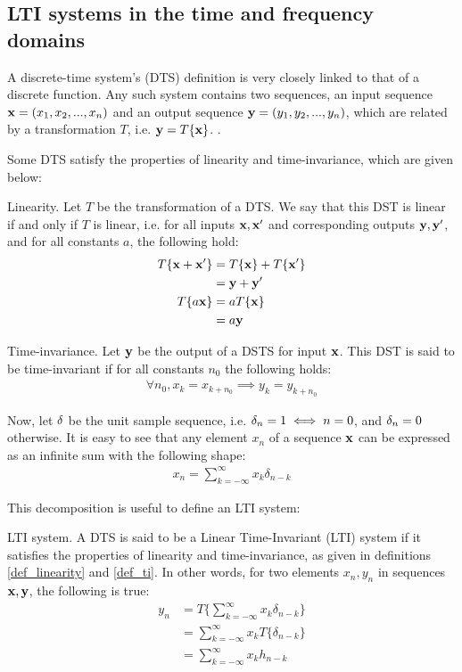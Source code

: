 \documentclass[../main.tex]{subfiles}
\begin{document}
\subsection{LTI systems in the time and frequency domains} \label{subsection_lti} 
A discrete-time system's (DTS) definition is very closely linked to that of a discrete function. Any such system contains two sequences, an input sequence $\mathbf{x} = (x_1, x_2, ..., x_n)$ and an output sequence $\mathbf{y} = (y_1, y_2, ..., y_n)$, which are related by a transformation $T$, i.e. $\mathbf{y} = T\{\mathbf{x}\}$.  \cite{Oppenheim2010}. 
\par Some DTS satisfy the properties of linearity and time-invariance, which are given below:
\begin{definition}{Linearity.} \label{def_linearity}
Let $T$ be the transformation of a DTS. We say that this DST is linear if and only if $T$ is linear, i.e. for all inputs $\mathbf{x, x}'$ and corresponding outputs $\mathbf{y, y}'$, and for all constants $a$, the following hold:
\begin{align*}
T\{\mathbf{x} + \mathbf{x}'\} &= T\{\mathbf{x}\} + T\{\mathbf{x}'\} \\
&= \mathbf{y} + \mathbf{y}'\\
T\{a\mathbf{x}\} &= aT\{\mathbf{x}\}\\
&= a\mathbf{y}
\end{align*}
\end{definition}
\begin{definition}{Time-invariance.} \label{def_ti}
Let $\mathbf{y}$ be the output of a DSTS for input $\mathbf{x}$. This DST is said to be time-invariant if for all constants $n_0$ the following holds:
\begin{align*}
\forall n_0, x_k = x_{k+n_0} \implies y_k = y_{k+n_0}
\end{align*}
\end{definition}
\par Now, let $\mathbf{\delta}$ be the unit sample sequence, i.e. $\mathbf{\delta}_n = 1 \iff n = 0$, and $\mathbf{\delta}_n = 0$ otherwise. It is easy to see that any element $x_n$ of a sequence $\mathbf{x}$ can be expressed as an infinite sum with the following shape:
\begin{align*}
x_n = \sum_{k=-\infty}^{\infty}x_k\delta_{n-k}
\end{align*}
\par This decomposition is useful to define an LTI system:
\begin{definition}{LTI system.} \label{def_lti}
A DTS is said to be a Linear Time-Invariant (LTI) system if it satisfies the properties of linearity and time-invariance, as given in definitions \ref{def_linearity} and \ref{def_ti}. In other words, for two elements $x_n, y_n$ in sequences $\mathbf{x, y}$, the following is true:
\begin{align*}
y_n &= T\{\sum_{k=-\infty}^{\infty}x_k\delta_{n-k}\}\\
&= \sum_{k=-\infty}^{\infty}x_kT\{\delta_{n-k}\}\\
&= \sum_{k=-\infty}^{\infty}x_kh_{n-k}
\end{align*}
\end{definition} 
\end{document}
